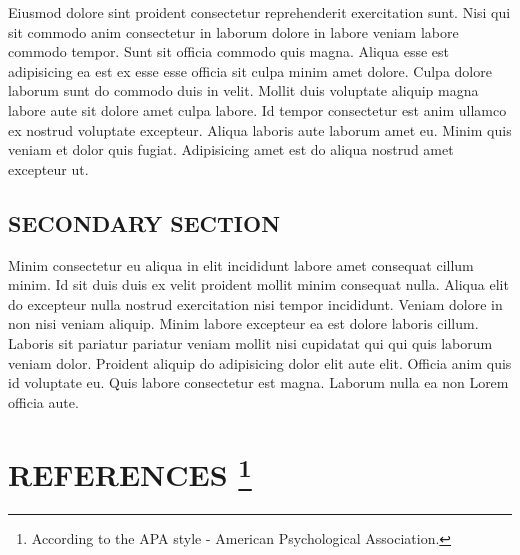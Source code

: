 \documentclass[
  12pt,
  a4paper,
  oneside]{tesesusp}
\begin{document}
Eiusmod dolore sint proident consectetur reprehenderit exercitation
sunt. Nisi qui sit commodo anim consectetur in laborum dolore in labore
veniam labore commodo tempor. Sunt sit officia commodo quis magna.
Aliqua esse est adipisicing ea est ex esse esse officia sit culpa minim
amet dolore. Culpa dolore laborum sunt do commodo duis in velit. Mollit
duis voluptate aliquip magna labore aute sit dolore amet culpa labore.
Id tempor consectetur est anim ullamco ex nostrud voluptate excepteur.
Aliqua laboris aute laborum amet eu. Minim quis veniam et dolor quis
fugiat. Adipisicing amet est do aliqua nostrud amet excepteur ut.

\hypertarget{secondary-section-2}{%
\section{SECONDARY SECTION}\label{secondary-section-2}}

Minim consectetur eu aliqua in elit incididunt labore amet consequat
cillum minim. Id sit duis duis ex velit proident mollit minim consequat
nulla. Aliqua elit do excepteur nulla nostrud exercitation nisi tempor
incididunt. Veniam dolore in non nisi veniam aliquip. Minim labore
excepteur ea est dolore laboris cillum. Laboris sit pariatur pariatur
veniam mollit nisi cupidatat qui qui quis laborum veniam dolor. Proident
aliquip do adipisicing dolor elit aute elit. Officia anim quis id
voluptate eu. Quis labore consectetur est magna. Laborum nulla ea non
Lorem officia aute.


\hypertarget{references-1}{%
\chapter*{\texorpdfstring{REFERENCES
\footnote{According to the APA style - American Psychological
  Association.}}{REFERENCES }}\label{references-1}}


\postextual
\end{document}
